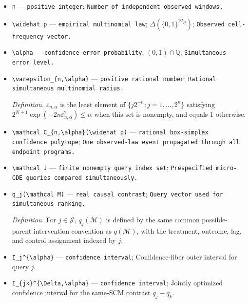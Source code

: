 \documentclass{article}
\begin{document}
\begin{itemize}
  \item \texttt{n} --- \texttt{positive integer}; \texttt{Number of independent observed windows.}
  \item \texttt{\textbackslash{}\allowbreak{}widehat p} --- \texttt{empirical multinomial law}; \(\Delta(\{0,1\}^{\mathcal W_H})\); \texttt{Observed cell-\allowbreak{}frequency vector.}
  \item \texttt{\textbackslash{}\allowbreak{}alpha} --- \texttt{confidence error probability}; \((0,1)\cap\mathbb Q\); \texttt{Simultaneous error level.}
  \item \texttt{\textbackslash{}\allowbreak{}varepsilon\_\allowbreak{}\{n,\allowbreak{}\textbackslash{}\allowbreak{}alpha\}\allowbreak{}} --- \texttt{positive rational number}; \texttt{Rational simultaneous multinomial radius.}
  \par\smallskip\noindent\emph{Definition.} \(\varepsilon_{n,\alpha}\) is the least element of \(\{j2^{-n}:j=1,\ldots,2^n\}\) satisfying \(2^{N+1}\exp(-2n\varepsilon_{n,\alpha}^2)\le\alpha\) when this set is nonempty, and equals \(1\) otherwise.
  \item \texttt{\textbackslash{}\allowbreak{}mathcal C\_\allowbreak{}\{n,\allowbreak{}\textbackslash{}\allowbreak{}alpha\}\allowbreak{}(\textbackslash{}\allowbreak{}widehat p)} --- \texttt{rational box-\allowbreak{}simplex confidence polytope}; \texttt{One observed-\allowbreak{}law event propagated through all endpoint programs.}
  \item \texttt{\textbackslash{}\allowbreak{}mathcal J} --- \texttt{finite nonempty query index set}; \texttt{Prespecified micro-\allowbreak{}CDE queries compared simultaneously.}
  \item \texttt{q\_\allowbreak{}j(\textbackslash{}\allowbreak{}mathcal M)} --- \texttt{real causal contrast}; \texttt{Query vector used for simultaneous ranking.}
  \par\smallskip\noindent\emph{Definition.} For \(j\in\mathcal J\), \(q_j(\mathcal M)\) is defined by the same common possible-parent intervention convention as \(q(\mathcal M)\), with the treatment, outcome, lag, and control assignment indexed by \(j\).
  \item \texttt{I\_\allowbreak{}j\textasciicircum{}\{\textbackslash{}\allowbreak{}alpha\}\allowbreak{}} --- \texttt{confidence interval}; Confidence-fiber outer interval for query \(j\).
  \item \texttt{I\_\allowbreak{}\{jk\}\allowbreak{}\textasciicircum{}\{\textbackslash{}\allowbreak{}Delta,\allowbreak{}\textbackslash{}\allowbreak{}alpha\}\allowbreak{}} --- \texttt{confidence interval}; Jointly optimized confidence interval for the same-SCM contrast \(q_j-q_k\).

\end{itemize}
\end{document}
